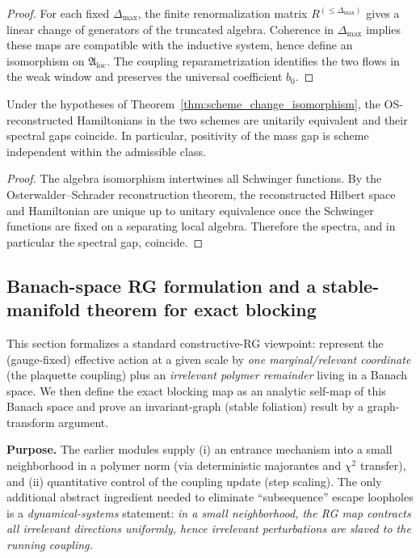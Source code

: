 \begin{proof}
For each fixed $\Delta_{\max}$, the finite renormalization matrix $R^{(\le\Delta_{\max})}$ gives a linear change of generators of the truncated
algebra.
Coherence in $\Delta_{\max}$ implies these maps are compatible with the inductive system, hence define an isomorphism on
$\mathfrak A_{\mathrm{loc}}$.
The coupling reparametrization identifies the two flows in the weak window and preserves the universal coefficient $b_0$.
\end{proof}

\begin{corollary}
\label{cor:scheme_independent_gap}
Under the hypotheses of Theorem~\ref{thm:scheme_change_isomorphism}, the OS-reconstructed Hamiltonians in the two schemes are unitarily equivalent and
their spectral gaps coincide.
In particular, positivity of the mass gap is scheme independent within the admissible class.
\end{corollary}

\begin{proof}
The algebra isomorphism intertwines all Schwinger functions.
By the Osterwalder--Schrader reconstruction theorem, the reconstructed Hilbert space and Hamiltonian are unique up to unitary equivalence once the
Schwinger functions are fixed on a separating local algebra.
Therefore the spectra, and in particular the spectral gap, coincide.
\end{proof}


\subsection{Banach-space RG formulation and a stable-manifold theorem for exact blocking}
\label{sec:banach_rg_stable_manifold}

This section formalizes a standard constructive-RG viewpoint: represent the (gauge-fixed) effective action at a given scale by
\emph{one marginal/relevant coordinate} (the plaquette coupling) plus an \emph{irrelevant polymer remainder} living in a Banach space.
We then define the exact blocking map as an analytic self-map of this Banach space and prove an invariant-graph (stable foliation)
result by a graph-transform argument.

\medskip
\noindent\textbf{Purpose.}
The earlier modules supply (i) an entrance mechanism into a small neighborhood in a polymer norm (via deterministic majorantes and
$\chi^2$ transfer), and (ii) quantitative control of the coupling update (step scaling).
The only additional abstract ingredient needed to eliminate ``subsequence'' escape loopholes is a \emph{dynamical-systems} statement:
\emph{in a small neighborhood, the RG map contracts all irrelevant directions uniformly, hence irrelevant perturbations are slaved to the
running coupling.}

